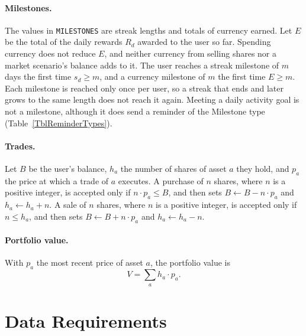 \documentclass[12pt]{article}
\begin{document}
\paragraph{Milestones.} The values in \texttt{MILESTONES} are streak lengths and
totals of currency earned. Let $E$ be the total of the daily rewards $R_d$
awarded to the user so far. Spending currency does not reduce $E$, and neither
currency from selling shares nor a market scenario's balance adds to it. The
user reaches a streak milestone of $m$ days the first time $s_d \geq m$, and a
currency milestone of $m$ the first time $E \geq m$. Each milestone is reached
only once per user, so a streak that ends and later grows to the same length
does not reach it again. Meeting a daily activity goal is not a milestone,
although it does send a reminder of the Milestone type
(Table~\ref{TblReminderTypes}).

\paragraph{Trades.} Let $B$ be the user's balance, $h_a$ the number of shares
of asset $a$ they hold, and $p_a$ the price at which a trade of $a$ executes.
A purchase of $n$ shares, where $n$ is a positive integer, is accepted only if
$n \cdot p_a \leq B$, and then sets $B \gets B - n \cdot p_a$ and
$h_a \gets h_a + n$. A sale of $n$ shares, where $n$ is a positive integer, is accepted only if $n \leq h_a$, and
then sets $B \gets B + n \cdot p_a$ and $h_a \gets h_a - n$.

\paragraph{Portfolio value.} With $p_a$ the most recent price of asset $a$, the
portfolio value is
\begin{equation}
V = \sum_{a} h_a \cdot p_a.
\end{equation}

\section{Data Requirements}

\end{document}
